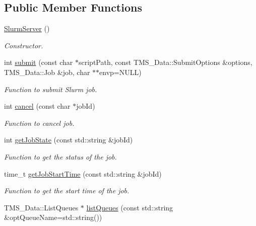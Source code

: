 \subsection*{Public Member Functions}
\begin{DoxyCompactItemize}
\item 
\hypertarget{classSlurmServer_a451ef6b48bbd0a0335a2f82790f42988}{
\hyperlink{classSlurmServer_a451ef6b48bbd0a0335a2f82790f42988}{SlurmServer} ()}
\label{classSlurmServer_a451ef6b48bbd0a0335a2f82790f42988}

\begin{DoxyCompactList}\small\item\em Constructor. \item\end{DoxyCompactList}\item 
int \hyperlink{classSlurmServer_a351897c7bb3d2b1810cb6ea0bee6262b}{submit} (const char $\ast$scriptPath, const TMS\_\-Data::SubmitOptions \&options, TMS\_\-Data::Job \&job, char $\ast$$\ast$envp=NULL)
\begin{DoxyCompactList}\small\item\em Function to submit Slurm job. \item\end{DoxyCompactList}\item 
int \hyperlink{classSlurmServer_a5965b0689881cee596641c47135357e7}{cancel} (const char $\ast$jobId)
\begin{DoxyCompactList}\small\item\em Function to cancel job. \item\end{DoxyCompactList}\item 
int \hyperlink{classSlurmServer_ac0466b9e8159a2b3e963ab274c00da1d}{getJobState} (const std::string \&jobId)
\begin{DoxyCompactList}\small\item\em Function to get the status of the job. \item\end{DoxyCompactList}\item 
time\_\-t \hyperlink{classSlurmServer_a85aab0d27ed279c3696a033ddf1a05bf}{getJobStartTime} (const std::string \&jobId)
\begin{DoxyCompactList}\small\item\em Function to get the start time of the job. \item\end{DoxyCompactList}\item 
TMS\_\-Data::ListQueues $\ast$ \hyperlink{classSlurmServer_a363bf0b22c519039244f6bc938577e9c}{listQueues} (const std::string \&optQueueName=std::string())
$$
\end{DoxyCompactItemize}
